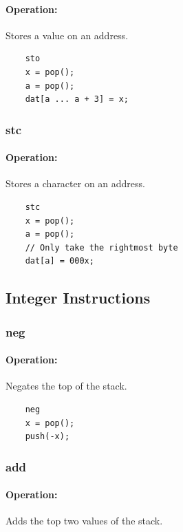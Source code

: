 \paragraph{Operation:}
Stores a value on an address.

	\begin{lstlisting}
	sto
	x = pop();
	a = pop();
	dat[a ... a + 3] = x;
	\end{lstlisting}

\subsubsection{stc}

\paragraph{Operation:}
Stores a character on an address.

	\begin{lstlisting}
	stc
	x = pop();
	a = pop();
	// Only take the rightmost byte
	dat[a] = 000x;
	\end{lstlisting}

\subsection{Integer Instructions}


\subsubsection{neg}

\paragraph{Operation:}
Negates the top of the stack.

	\begin{lstlisting}
	neg
	x = pop();
	push(-x);
	\end{lstlisting}

\subsubsection{add}

\paragraph{Operation:}
Adds the top two values of the stack.

